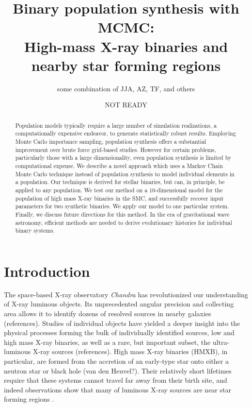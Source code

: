 \documentclass[12pt, preprint]{aastex}
\begin{document}
\title{Binary population synthesis with MCMC: \\ High-mass X-ray binaries and nearby star forming regions}
\author{some combination of JJA, AZ, TF, and others}
\date{NOT READY}

\begin{abstract}
Population models typically require a large number of simulation realizations, a computationally expensive endeavor, to generate statistically robust results. Employing Monte Carlo importance sampling, population synthesis offers a substantial improvement over brute force grid-based studies. However for certain problems, particularly those with a large dimensionality, even population synthesis is limited by computational expense. We describe a novel approach which uses a Markov Chain Monte Carlo technique instead of population synthesis to model individual elements in a population. Our technique is derived for stellar binaries, but can, in principle, be applied to any population. We test our method on a 10-dimensional model for the population of high mass X-ray binaries in the SMC, and successfully recover input parameters for two synthetic binaries. We apply our model to one particular system. Finally, we discuss future directions for this method. In the era of gravitational wave astronomy, efficient methods are needed to derive evolutionary histories for individual binary systems.
\end{abstract}





\section{Introduction}


The space-based X-ray observatory {\it Chandra} has revolutionized our understanding of X-ray luminous objects. Its unprecedented angular precision and collecting area allows it to identify dozens of resolved sources in nearby galaxies (references). Studies of individual objects have yielded a deeper insight into the physical processes forming the bulk of individually identified sources, low and high mass X-ray binaries, as well as a rare, but important subset, the ultra-luminous X-ray sources (references). High mass X-ray binaries (HMXB), in particular, are formed from the accretion of an early-type star onto either a neutron star or black hole (van den Heuvel?). Their relatively short lifetimes require that these systems cannot travel far away from their birth site, and indeed observations show that many of luminous X-ray sources are near star forming regions \citep{zezas02, kaaret04}. 
\end{document}
